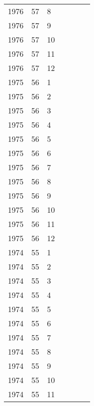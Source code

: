 \begin{longtable}{ |l|l|l|l|p{2.7cm}|l|p{2cm}| }
 1976 & 57 &     8 &         &                &  & \\
 1976 & 57 &     9 &         &                &  & \\
 1976 & 57 &    10 &         &                &  & \\
 1976 & 57 &    11 &         &                &  & \\
 1976 & 57 &    12 &         &                &   & \\
 1975 & 56 &     1 &         &                &  & \\
 1975 & 56 &     2 &         &                &  & \\
 1975 & 56 &     3 &         &                &  & \\
 1975 & 56 &     4 &         &                &  & \\
 1975 & 56 &     5 &         &                &  & \\
 1975 & 56 &     6 &         &                &  & \\
 1975 & 56 &     7 &         &                &  & \\
 1975 & 56 &     8 &         &                &  & \\
 1975 & 56 &     9 &         &                &  & \\
 1975 & 56 &    10 &         &                &  & \\
 1975 & 56 &    11 &         &                &  & \\
 1975 & 56 &    12 &         &                &  & \\
 1974 & 55 &     1 &         &                &  & \\
 1974 & 55 &     2 &         &                &  & \\
 1974 & 55 &     3 &         &                &  & \\
 1974 & 55 &     4 &         &                &  & \\
 1974 & 55 &     5 &         &                &  & \\
 1974 & 55 &     6 &         &                &  & \\
 1974 & 55 &     7 &         &                &  & \\
 1974 & 55 &     8 &         &                &  & \\
 1974 & 55 &     9 &         &                &  & \\
 1974 & 55 &    10 &         &                &  & \\
 1974 & 55 &    11 &         &                &  & \\

\end{longtable}
